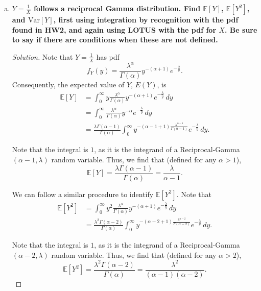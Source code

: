 \documentclass[11pt]{article}
\newenvironment{solution}
  {\renewcommand\qedsymbol{$\blacksquare$}\begin{proof}[Solution]}
  {\end{proof}}
\begin{document}
\begin{enumerate}
\begin{enumerate}[a)]
\begin{solution}
	Note that the integral is $1$, as it is the integrand of a $Gamma(\alpha + k, \lambda)$ random variable. Thus, we find that
	\[
		\boxed{E(X^k) = \frac{\Gamma(\alpha + k)}{\lambda^k \Gamma(\alpha)}}. \qedhere
	\]
	\end{solution}

	\item \textbf{$Y = \frac{1}{X}$ follows a reciprocal Gamma distribution. Find $\mathbb{E}\left[Y \right] $, $\mathbb{E}\left[Y^2 \right] $, and $\mathrm{Var} \left[Y \right]$, first using integration by recognition with the pdf found in HW2, and again
	using LOTUS with the pdf for $X$. Be sure to say if there are conditions when these are not defined.}

	\begin{solution}
		Note that $Y = \frac{1}{X}$ has pdf 
		\[
			f_Y(y) = \frac{\lambda^\alpha}{\Gamma(\alpha)} y^{-(\alpha + 1)}e^{-\frac{\lambda}{y}}.
		\]
		Consequently, the expected value of $Y$, $E(Y)$, is
		\begin{align*}
			\mathbb{E}\left[Y \right] &= \int_0^{\infty} y\frac{\lambda^\alpha}{\Gamma(\alpha)} y^{-(\alpha + 1)}e^{-\frac{\lambda}{y}} \, dy \\
			&= \int_0^{\infty} \frac{\lambda^\alpha}{\Gamma(\alpha)} y^{-\alpha}e^{-\frac{\lambda}{y}} \, dy \\
			&= \frac{\lambda \Gamma(\alpha - 1)}{\Gamma(\alpha)} \int_0^{\infty} y^{-(\alpha - 1 + 1) \frac{\lambda^{\alpha - 1}}{\Gamma(\alpha - 1)}} e^{-\frac{\lambda}{y}} \, dy.
		\end{align*}

		Note that the integral is $1$, as it is the integrand of a Reciprocal-Gamma$(\alpha - 1, \lambda)$ random variable. Thus, we find that (defined for any $\alpha > 1$),
		\[
			\boxed{\mathbb{E}\left[Y \right] = \frac{\lambda \Gamma(\alpha - 1)}{\Gamma(\alpha)} = \frac{\lambda}{\alpha - 1}}.
		\]

		We can follow a similar procedure to identify $\mathbb{E}\left[Y^2 \right]$. Note that
		\begin{align*}
			\mathbb{E}\left[Y^2 \right] &= \int_0^{\infty} y^2\frac{\lambda^\alpha}{\Gamma(\alpha)} y^{-(\alpha + 1)}e^{-\frac{\lambda}{y}} \, dy \\
			&= \frac{\lambda^{2}  \Gamma(\alpha - 2)}{\Gamma(\alpha)} \int_0^{\infty} y^{-(\alpha - 2 + 1) \frac{\lambda^{\alpha - 2}}{\Gamma(\alpha - 2)}} e^{-\frac{\lambda}{y}} \, dy.
		\end{align*}

		Note that the integral is $1$, as it is the integrand of a Reciprocal-Gamma$(\alpha - 2, \lambda)$ random variable. Thus, we find that (defined for any $\alpha > 2$),
		\[
			\boxed{\mathbb{E}\left[Y^2 \right] = \frac{\lambda^2 \Gamma(\alpha - 2)}{\Gamma(\alpha)} = \frac{\lambda^2}{(\alpha - 1)(\alpha - 2)}}.
		\]


\end{solution}
\end{enumerate}
\end{enumerate}
\end{document}
